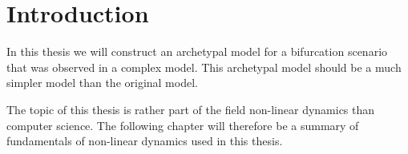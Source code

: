 \chapter{Introduction}

In this thesis we will construct an archetypal model for a bifurcation scenario that was observed in a complex model.
This archetypal model should be a much simpler model than the original model.


The topic of this thesis is rather part of the field non-linear dynamics than computer science.
The following chapter will therefore be a summary of fundamentals of non-linear dynamics used in this thesis.
